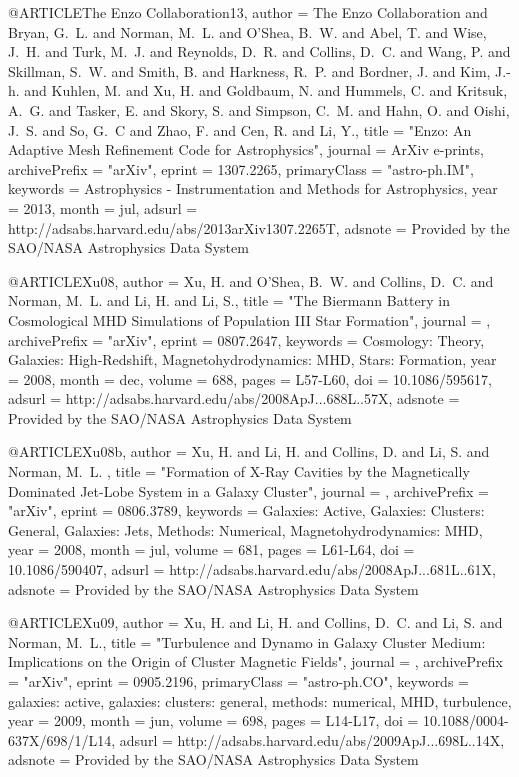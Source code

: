 {@ARTICLE{The Enzo Collaboration13,
   author = {{The Enzo Collaboration} and {Bryan}, G.~L. and {Norman}, M.~L. and 
	{O'Shea}, B.~W. and {Abel}, T. and {Wise}, J.~H. and {Turk}, M.~J. and 
	{Reynolds}, D.~R. and {Collins}, D.~C. and {Wang}, P. and {Skillman}, S.~W. and 
	{Smith}, B. and {Harkness}, R.~P. and {Bordner}, J. and {Kim}, J.-h. and 
	{Kuhlen}, M. and {Xu}, H. and {Goldbaum}, N. and {Hummels}, C. and 
	{Kritsuk}, A.~G. and {Tasker}, E. and {Skory}, S. and {Simpson}, C.~M. and 
	{Hahn}, O. and {Oishi}, J.~S. and {So}, G.~C and {Zhao}, F. and 
	{Cen}, R. and {Li}, Y.},
    title = "{Enzo: An Adaptive Mesh Refinement Code for Astrophysics}",
  journal = {ArXiv e-prints},
archivePrefix = "arXiv",
   eprint = {1307.2265},
 primaryClass = "astro-ph.IM",
 keywords = {Astrophysics - Instrumentation and Methods for Astrophysics},
     year = 2013,
    month = jul,
   adsurl = {http://adsabs.harvard.edu/abs/2013arXiv1307.2265T},
  adsnote = {Provided by the SAO/NASA Astrophysics Data System}
}

@ARTICLE{Xu08,
   author = {{Xu}, H. and {O'Shea}, B.~W. and {Collins}, D.~C. and {Norman}, M.~L. and 
	{Li}, H. and {Li}, S.},
    title = "{The Biermann Battery in Cosmological MHD Simulations of Population III Star Formation}",
  journal = {\apjl},
archivePrefix = "arXiv",
   eprint = {0807.2647},
 keywords = {Cosmology: Theory, Galaxies: High-Redshift, Magnetohydrodynamics: MHD, Stars: Formation},
     year = 2008,
    month = dec,
   volume = 688,
    pages = {L57-L60},
      doi = {10.1086/595617},
   adsurl = {http://adsabs.harvard.edu/abs/2008ApJ...688L..57X},
  adsnote = {Provided by the SAO/NASA Astrophysics Data System}
}

@ARTICLE{Xu08b,
   author = {{Xu}, H. and {Li}, H. and {Collins}, D. and {Li}, S. and {Norman}, M.~L.
	},
    title = "{Formation of X-Ray Cavities by the Magnetically Dominated Jet-Lobe System in a Galaxy Cluster}",
  journal = {\apjl},
archivePrefix = "arXiv",
   eprint = {0806.3789},
 keywords = {Galaxies: Active, Galaxies: Clusters: General, Galaxies: Jets, Methods: Numerical, Magnetohydrodynamics: MHD},
     year = 2008,
    month = jul,
   volume = 681,
    pages = {L61-L64},
      doi = {10.1086/590407},
   adsurl = {http://adsabs.harvard.edu/abs/2008ApJ...681L..61X},
  adsnote = {Provided by the SAO/NASA Astrophysics Data System}
}

@ARTICLE{Xu09,
   author = {{Xu}, H. and {Li}, H. and {Collins}, D.~C. and {Li}, S. and 
	{Norman}, M.~L.},
    title = "{Turbulence and Dynamo in Galaxy Cluster Medium: Implications on the Origin of Cluster Magnetic Fields}",
  journal = {\apjl},
archivePrefix = "arXiv",
   eprint = {0905.2196},
 primaryClass = "astro-ph.CO",
 keywords = {galaxies: active, galaxies: clusters: general, methods: numerical, MHD, turbulence},
     year = 2009,
    month = jun,
   volume = 698,
    pages = {L14-L17},
      doi = {10.1088/0004-637X/698/1/L14},
   adsurl = {http://adsabs.harvard.edu/abs/2009ApJ...698L..14X},
  adsnote = {Provided by the SAO/NASA Astrophysics Data System}
}

}
